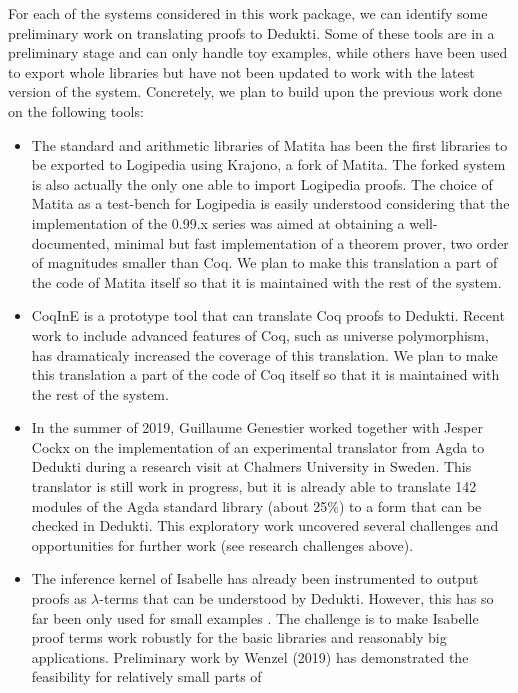 For each of the systems considered in this work package, we can
identify some preliminary work on translating proofs to Dedukti. Some
of these tools are in a preliminary stage and can only handle toy
examples, while others have been used to export whole libraries but
have not been updated to work with the latest version of the
system. Concretely, we plan to build upon the previous work done on
the following tools:
\begin{itemize}
\item The standard and arithmetic libraries of Matita has been the
  first libraries to be exported to Logipedia using Krajono, a fork of
  Matita. The forked system is also actually the only one able to
  import Logipedia proofs. The choice of Matita as a test-bench for
  Logipedia is easily understood considering that the implementation
  of the 0.99.x series was aimed at obtaining a well-documented,
  minimal but fast implementation of a theorem prover, two order of
  magnitudes smaller than Coq.  We plan to make this translation a
  part of the code of Matita itself so that it is maintained with the
  rest of the system.
\item CoqInE is a prototype tool that can translate Coq proofs to
  Dedukti. Recent work to include advanced features of Coq, such as
  universe polymorphism, has dramaticaly increased the coverage of
  this translation. We plan to make this translation a part of the
  code of Coq itself so that it is maintained with the rest of the
  system.
  \item In the summer of 2019, Guillaume Genestier worked together
  with Jesper Cockx on the implementation of an experimental
  translator from Agda to Dedukti during a research visit at Chalmers
  University in Sweden. This translator is still work in progress, but
  it is already able to translate 142 modules of the Agda standard
  library (about 25\%) to a form that can be checked in Dedukti. This
  exploratory work uncovered several challenges and opportunities for
  further work (see research challenges above).
  \item The inference kernel of Isabelle has already been instrumented
  to output proofs as $\lambda$-terms that can be understood by
  Dedukti. However, this has so far been only used for small examples
  \cite{Berghofer-Nipkow:2000:TPHOL}. The challenge is to make
  Isabelle proof terms work robustly for the basic libraries and
  reasonably big applications.  Preliminary work by Wenzel (2019) has
  demonstrated the feasibility for relatively small parts of

\end{itemize}
